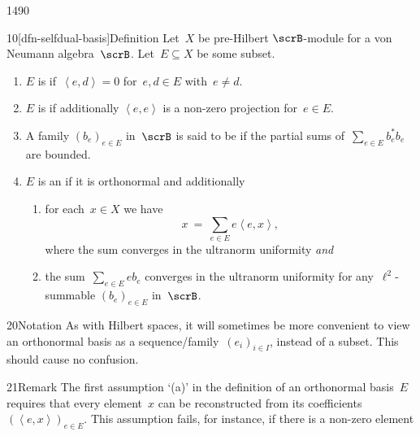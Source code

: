 \begin{parsec}{1490}%
\begin{point}{10}[dfn-selfdual-basis]{Definition}
    Let~$X$ be pre-Hilbert $\scrB$-module
        for a von Neumann algebra~$\scrB$.
    Let~$E \subseteq X$ be some subset.
    \begin{enumerate}
        \item $E$ is  if~$\left<e,d\right> = 0$
            for~$e,d \in E$ with~$e \neq d$.
        \item $E$ is  if additionally
                    $\left<e,e\right>$ is a non-zero projection
                    for~$e \in E$.
        \item A family $(b_e)_{e \in E}$ in~$\scrB$
                is said to be 
                if the partial sums of~$\sum_{e \in E} b_e^*b_e$
                are bounded.
        \item $E$ is an  if
                it is orthonormal and additionally
            \begin{enumerate}
                \item for each~$x \in X$ we have
                    \begin{equation*}
                        x \ =\  \sum_{e \in E} e\left<e,x\right>,
                    \end{equation*}
                    where the sum converges in the ultranorm uniformity
                    \emph{and}
                \item  the sum~$\sum_{e \in E} eb_e$
                        converges in the ultranorm uniformity
                    for any~$\ell^2$-summable $(b_e)_{e \in E}$
                        in~$\scrB$.
            \end{enumerate}
    \end{enumerate}
\spacingfix{}
\begin{point}{20}{Notation}%
As with Hilbert spaces, it will sometimes be more convenient
    to view an orthonormal basis as a sequence/family~$(e_i)_{i \in I}$,
    instead of a subset. This should cause no confusion.
\end{point}
\begin{point}{21}{Remark}%
The first assumption `(a)' in the definition of an orthonormal basis~$E$
    requires that every element~$x$ can be reconstructed
    from its coefficients~$(\left<e, x\right>)_{e \in E}$.
This assumption fails, for instance, if there is a non-zero element

\end{point}
\end{point}
\end{parsec}
